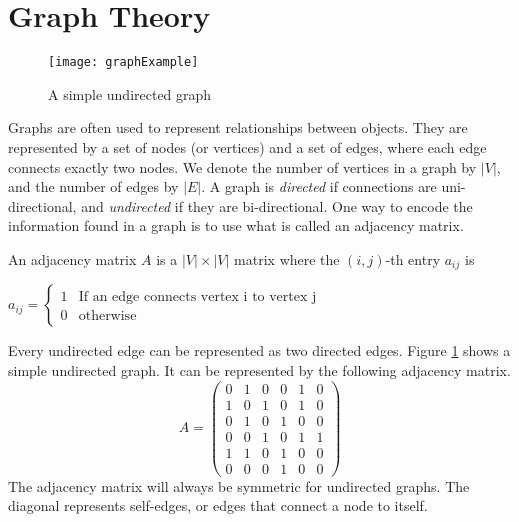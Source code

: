 
\label{lab:ImgSeg_eigenvalues}

\section*{Graph Theory}
\begin{figure}[h]
\texttt{[image: graphExample]}
\caption{A simple undirected graph}
\label{fig:example_graph}
\end{figure}


Graphs are often used to represent relationships between objects.
They are represented by a set of nodes (or vertices) and a set of edges, where each edge connects exactly two nodes.
We denote the number of vertices in a graph by $|V|$, and the number of edges by $|E|$.
A graph is \emph{directed} if connections are uni-directional, and \emph{undirected} if they are bi-directional.
One way to encode the information found in a graph is to use what is called an adjacency matrix.
\begin{definition} An adjacency matrix $A$ is a $|V| \times |V|$ matrix where the $(i,j)$-th entry $a_{ij}$ is
\begin{center}
	$a_{ij} = \begin{cases} 1 & \mbox{If an edge connects vertex i to vertex j} \\ 0 & \mbox{otherwise} \end{cases}$
\end{center}
\end{definition}

Every undirected edge can be represented as two directed edges.
Figure \ref{fig:example_graph} shows a simple undirected graph.
It can be represented by the following adjacency matrix.
\[
A = \begin{pmatrix}
0 & 1 & 0 & 0 & 1 & 0\\
1 & 0 & 1 & 0 & 1 & 0\\
0 & 1 & 0 & 1 & 0 & 0\\
0 & 0 & 1 & 0 & 1 & 1\\
1 & 1 & 0 & 1 & 0 & 0\\
0 & 0 & 0 & 1 & 0 & 0
\end{pmatrix}
\]
The adjacency matrix will always be symmetric for undirected graphs.
The diagonal represents self-edges, or edges that connect a node to itself.

